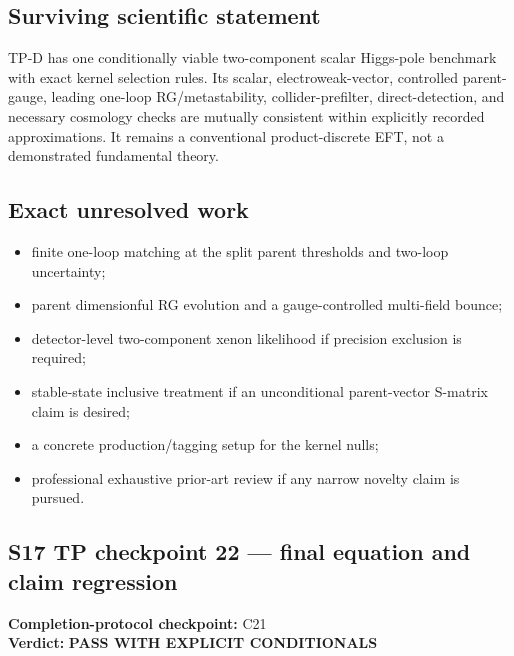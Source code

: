 \documentclass[
]{article}
\providecommand{\tightlist}{%
  \setlength{\itemsep}{0pt}\setlength{\parskip}{0pt}}
\begin{document}
\hypertarget{surviving-scientific-statement}{%
\subsection{Surviving scientific
statement}\label{surviving-scientific-statement}}

TP-D has one conditionally viable two-component scalar Higgs-pole
benchmark with exact kernel selection rules. Its scalar,
electroweak-vector, controlled parent-gauge, leading one-loop
RG/metastability, collider-prefilter, direct-detection, and necessary
cosmology checks are mutually consistent within explicitly recorded
approximations. It remains a conventional product-discrete EFT, not a
demonstrated fundamental theory.

\hypertarget{exact-unresolved-work}{%
\subsection{Exact unresolved work}\label{exact-unresolved-work}}

\begin{itemize}
\tightlist
\item
  finite one-loop matching at the split parent thresholds and two-loop
  uncertainty;
\item
  parent dimensionful RG evolution and a gauge-controlled multi-field
  bounce;
\item
  detector-level two-component xenon likelihood if precision exclusion
  is required;
\item
  stable-state inclusive treatment if an unconditional parent-vector
  S-matrix claim is desired;
\item
  a concrete production/tagging setup for the kernel nulls;
\item
  professional exhaustive prior-art review if any narrow novelty claim
  is pursued.
\end{itemize}

\newpage

\hypertarget{s17-tp-checkpoint-22-final-equation-and-claim-regression}{%
\subsection{S17 TP checkpoint 22 --- final equation and claim
regression}\label{s17-tp-checkpoint-22-final-equation-and-claim-regression}}

\textbf{Completion-protocol checkpoint:} C21\\
\textbf{Verdict:} \textbf{PASS WITH EXPLICIT CONDITIONALS}
\end{document}
